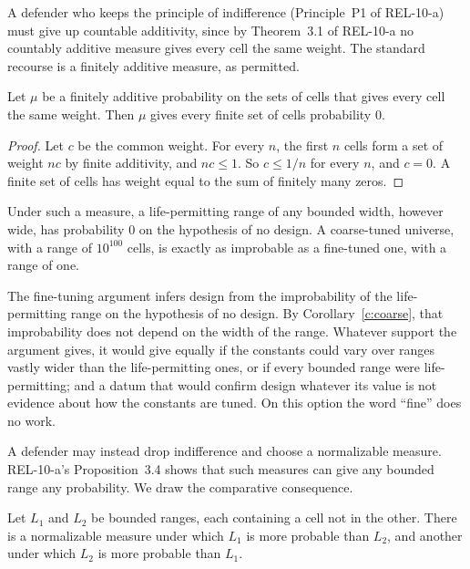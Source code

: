 \documentclass{situationist-preprint}
\begin{document}
A defender who keeps the principle of indifference (Principle~P1 of REL-10-a) must give up countable additivity, since by Theorem~3.1 of REL-10-a no countably additive measure gives every cell the same weight. The standard recourse is a finitely additive measure, as \citet{deFinetti1974} permitted.

\begin{proposition}\label{p:fa}
Let $\mu$ be a finitely additive probability on the sets of cells that gives every cell the same weight. Then $\mu$ gives every finite set of cells probability $0$.
\end{proposition}

\begin{proof}
Let $c$ be the common weight. For every $n$, the first $n$ cells form a set of weight $nc$ by finite additivity, and $nc \leq 1$. So $c \leq 1/n$ for every $n$, and $c = 0$. A finite set of cells has weight equal to the sum of finitely many zeros.
\end{proof}

\begin{corollary}\label{c:coarse}
Under such a measure, a life-permitting range of any bounded width, however wide, has probability $0$ on the hypothesis of no design. A coarse-tuned universe, with a range of $10^{100}$ cells, is exactly as improbable as a fine-tuned one, with a range of one.
\end{corollary}

The fine-tuning argument infers design from the improbability of the life-permitting range on the hypothesis of no design. By Corollary~\ref{c:coarse}, that improbability does not depend on the width of the range. Whatever support the argument gives, it would give equally if the constants could vary over ranges vastly wider than the life-permitting ones, or if every bounded range were life-permitting; and a datum that would confirm design whatever its value is not evidence about how the constants are tuned. On this option the word \enquote{fine} does no work.

A defender may instead drop indifference and choose a normalizable measure. REL-10-a's Proposition~3.4 shows that such measures can give any bounded range any probability. We draw the comparative consequence.

\begin{proposition}\label{p:reverse}
Let $L_1$ and $L_2$ be bounded ranges, each containing a cell not in the other. There is a normalizable measure under which $L_1$ is more probable than $L_2$, and another under which $L_2$ is more probable than $L_1$.
\end{proposition}
\end{document}
